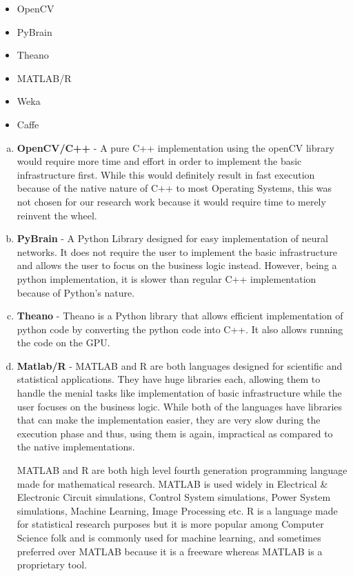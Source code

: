 \documentclass{article}
\begin{document}
\begin{itemize}
	\item OpenCV \cite{opencv}
	\item PyBrain \cite{pybrain}
	\item Theano \cite{theano}\cite{theano-scipy}
	\item MATLAB/R
	\item Weka \cite{weka}
	\item Caffe \cite{caffe}
\end{itemize}

\begin{enumerate}[a)]
	\item \textbf{OpenCV/C++} - A pure C++ implementation using the openCV library would require more time and effort in order to implement the basic infrastructure first. While this would definitely result in fast execution because of the native nature of C++ to most Operating Systems, this was not chosen for our research work because it would require time to merely reinvent the wheel.
	\item \textbf{PyBrain} - A Python Library designed for easy implementation of neural networks. It does not require the user to implement the basic infrastructure and allows the user to focus on the business logic instead. However, being a python implementation, it is slower than regular C++ implementation because of Python's nature.
	\item \textbf{Theano} - Theano is a Python library that allows efficient implementation of python code by converting the python code into C++. It also allows running the code on the GPU.
	\item \textbf{Matlab/R} - MATLAB and R are both languages designed for scientific and statistical applications. They have huge libraries each, allowing them to handle the menial tasks like implementation of basic infrastructure while the user focuses on the business logic. While both of the languages have libraries that can make the implementation easier, they are very slow during the execution phase and thus, using them is again, impractical as compared to the native implementations.
	\par	
MATLAB and R are both high level fourth generation programming language made for mathematical research. MATLAB is used widely in Electrical \& Electronic Circuit simulations, Control System simulations, Power System simulations, Machine Learning, Image Processing etc. R is a language made for statistical research purposes but it is more popular among Computer Science folk and is commonly used for machine learning, and sometimes preferred over MATLAB because it is a freeware whereas MATLAB is a proprietary tool.

\end{enumerate}
\end{document}
